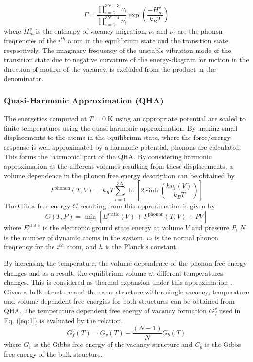 \documentclass{article}
\begin{document}
%
\begin{equation} \label{eq:6}
\Gamma = \dfrac{\displaystyle \prod_{i=1}^{3N-3}\nu_i}{\displaystyle \prod_{i=1}^{3N-4}\nu_i^\prime} \exp\left(\dfrac{-H^v_m}{k_BT}\right)
\end{equation}
%
where $H^v_m$ is the enthalpy of vacancy migration, $\nu_i$ and $\nu_i^\prime$ are the phonon frequencies of the $i^{th}$ atom in the equilibrium state and the transition state respectively. The imaginary frequency of the unstable vibration mode of the transition state due to negative curvature of the energy-diagram for motion in the direction of motion of the vacancy, is excluded from the product in the denominator.

\subsubsection{Quasi-Harmonic Approximation (QHA)} 

\noindent The energetics computed at $T=0$ K using an appropriate potential are scaled to finite temperatures using the quasi-harmonic approximation. By making small displacements to the atoms in the equilibrium state, where the force/energy response is well approximated by a harmonic potential, phonons are calculated. This forms the \enquote*{harmonic} part of the QHA. By considering harmonic approximation at the different volumes resulting from these displacements, a volume dependence in the phonon free energy description can be obtained by,
%
\begin{equation} \label{eq:7}
F^{\mathrm{phonon}}(T, V) = k_B T\sum_{i=1}^{3N} \ln \left[2 \sinh \left(\dfrac{h \upsilon_i(V)}{k_B T}\right)\right]
\end{equation}
%
The Gibbs free energy $G$ resulting from this approximation is given by
%
\begin{equation} \label{eq:8}
G(T, P)=\min_{V}[E^{\mathrm{static}}(V) +  F^{\mathrm{phonon}}(T, V) + PV]
\end{equation}
%
where $E^{\mathrm{static}}$ is the electronic ground state energy at volume $V$ and pressure $P$, $N$ is the number of dynamic atoms in the system, $\upsilon_i$ is the normal phonon frequency for the $i^{th}$ atom, and $h$ is the Planck's constant. 

By increasing the temperature, the volume dependence of the phonon free energy changes and as a result, the equilibrium volume at different temperatures changes. This is considered as thermal expansion under this approximation \cite{Togo2010}. Given a bulk structure and the same structure with a single vacancy, temperature and volume dependent free energies for both structures can be obtained from QHA. The temperature dependent free energy of vacancy formation $G^v_f$ used in Eq. (\ref{eq:1}) is evaluated by the relation,
%
\begin{equation} \label{eq:9}
G^v_f(T) = G_v(T)  - \dfrac{(N - 1)}{N} G_b(T)
\end{equation}
%
where $G_v$ is the Gibbs free energy of the vacancy structure and $G_b$ is the Gibbs free energy of the bulk structure. 
\end{document}
